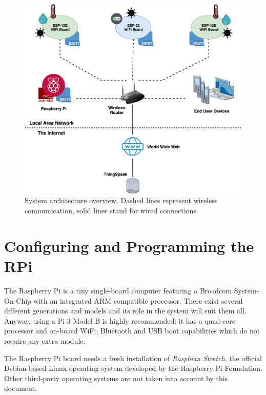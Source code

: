 \begin{figure}[H]
	\begin{center}
		\includegraphics[width=\textwidth]{./pictures/architecture_overview.png}
		\caption{System architecture overview. Dashed lines represent wireless communication, solid lines stand for wired connections.}
		\label{architecture_overview}
	\end{center}
\end{figure}

\section{Configuring and Programming the RPi}
The Raspberry Pi is a tiny single-board computer featuring a Broadcom System-On-Chip with an integrated ARM compatible processor. There exist several different generations and models and its role in the system will suit them all. Anyway, using a Pi 3 Model B is highly recommended: it has a quad-core processor and on-board WiFi, Bluetooth and USB boot capabilities which do not require any extra module.

The Raspberry Pi board needs a fresh installation of \textit{Raspbian Stretch}, the official Debian-based Linux operating system developed by the Raspberry Pi Foundation. Other third-party operating systems are not taken into account by this document.

